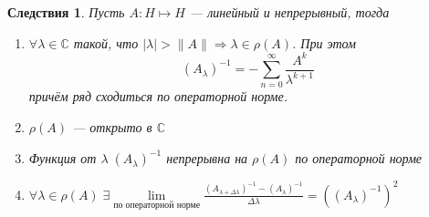 \documentclass[12pt]{article}
\begin{document}
\newtheorem{Sled}{Следствия}
\begin{Sled}
    Пусть $A : H \mapsto H$ --- линейный и непрерывный, тогда
    \begin{enumerate}
        \item{$\forall \lambda \in \mathbb C$ такой, что $|\lambda| > \|A\| \Rightarrow  \lambda \in \rho(A)$.
            При этом 
            $$
            (A_\lambda)^{-1} = -\sum \limits_{n = 0}^{\infty}\frac{A^k}{\lambda^{k+1}}
            $$
            причём ряд сходиться по операторной норме.}
        \item{$\rho(A)$ --- открыто в $\mathbb C$}
        \item{Функция от $\lambda\; (A_\lambda)^{-1}$ непрерывна на $\rho(A)$ по операторной норме}
        \item{$\forall \lambda \in \rho(A)\; \exists \lim\limits_{\text{по операторной норме}}\frac{(A_{\lambda + \Delta \lambda})^{-1} - (A_\lambda)^{-1}}{\Delta\lambda} =
            ((A_\lambda)^{-1})^2$}
    \end{enumerate}
\end{Sled}
\end{document}
